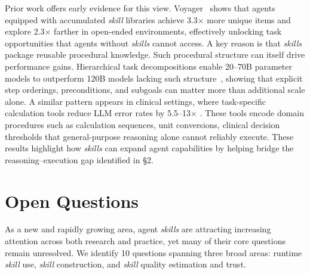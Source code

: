 \documentclass[sigconf,nonacm]{acmart}
\begin{document}
Prior work offers early evidence for this view.
Voyager~\cite{wang2024voyager} shows that agents equipped with accumulated \emph{skill} libraries achieve 3.3$\times$ more unique items and explore 2.3$\times$ farther in open-ended environments, effectively unlocking task opportunities  that agents without \emph{skills} cannot access. %
A key reason is that \emph{skills} package reusable procedural knowledge.
Such procedural structure can itself drive performance gains. Hierarchical task decompositions enable 
20--70B parameter models to outperform 120B models lacking such structure~\cite{htn2025}, showing that explicit step orderings, preconditions, and subgoals can matter more than additional scale alone. 
A similar pattern appears in clinical settings, where task-specific  calculation tools reduce LLM error rates by 5.5--13$\times$ \cite{clinicalcalc2025}. These tools encode domain procedures such as calculation sequences, unit conversions, clinical decision thresholds that general-purpose reasoning alone cannot reliably execute. 
These results highlight how \emph{skills} can expand agent capabilities by helping bridge the reasoning--execution gap identified in \S2.





\vspace{-4pt}
\section{Open Questions}
\label{sec:qs}
As a new and rapidly growing area, agent \emph{skills} are attracting increasing attention across both research and practice, yet many of their core questions remain unresolved. We identify  10 questions   spanning three broad areas: runtime \emph{skill} use, \emph{skill} construction, and \emph{skill} quality estimation and trust.
 
\end{document}
